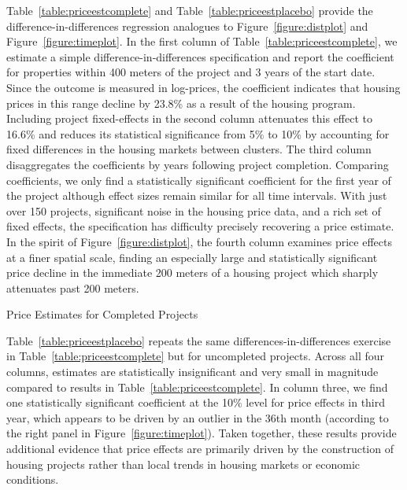 \documentclass[12pt]{article}
\begin{document}
Table~\ref{table:priceestcomplete} and Table~\ref{table:priceestplacebo} provide the difference-in-differences regression analogues to Figure~\ref{figure:distplot} and Figure~\ref{figure:timeplot}.  In the first column of Table~\ref{table:priceestcomplete}, we estimate a simple difference-in-differences specification and report the coefficient for properties within 400 meters of the project and 3 years of the start date.  Since the outcome is measured in log-prices, the coefficient indicates that housing prices in this range decline by 23.8\% as a result of the housing program.  Including project fixed-effects in the second column attenuates this effect to 16.6\% and reduces its statistical significance from 5\% to 10\% by accounting for fixed differences in the housing markets between clusters.  The third column disaggregates the coefficients by years following project completion.  Comparing coefficients, we only find a statistically significant coefficient for the first year of the project although effect sizes remain similar for all time intervals.  With just over 150 projects, significant noise in the housing price data, and a rich set of fixed effects, the specification has difficulty precisely recovering a price estimate.  In the spirit of Figure~\ref{figure:distplot}, the fourth column examines price effects at a finer spatial scale, finding an especially large and statistically significant price decline in the immediate 200 meters of a housing project which sharply attenuates past 200 meters.

\begin{table}
\caption{Price Estimates for Completed Projects}\label{table:priceestcomplete}
\centering

\end{table}

Table~\ref{table:priceestplacebo} repeats the same differences-in-differences exercise in Table~\ref{table:priceestcomplete} but for uncompleted projects.  Across all four columns, estimates are statistically insignificant and very small in magnitude compared to results in Table~\ref{table:priceestcomplete}.  In column three, we find one statistically significant coefficient at the 10\% level for price effects in third year, which appears to be driven by an outlier in the 36th month (according to the right panel in Figure~\ref{figure:timeplot}).  Taken together, these results provide additional evidence that price effects are primarily driven by the construction of housing projects rather than local trends in housing markets or economic conditions.
\end{document}
